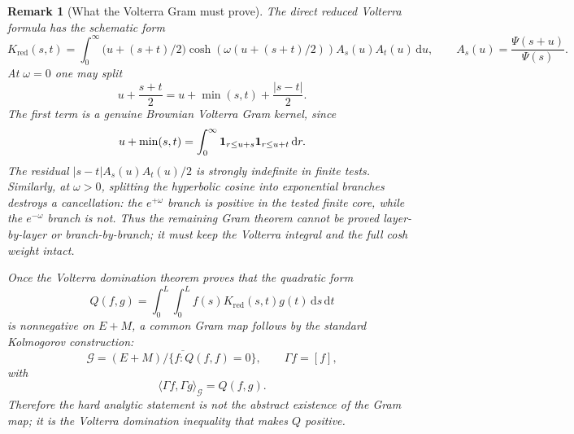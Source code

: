 \documentclass[11pt]{article}
\newtheorem{remark}[theorem]{Remark}
\newcommand{\dd}{\,\mathrm d}
\newcommand{\Kred}{K_{\mathrm{red}}}
\begin{document}
\begin{remark}[What the Volterra Gram must prove]
The direct reduced Volterra formula has the schematic form
\[
  \Kred(s,t)
  =
  \int_0^\infty
  \bigl(u+(s+t)/2\bigr)
  \cosh(\omega(u+(s+t)/2))
  A_s(u)A_t(u)\dd u,
  \qquad
  A_s(u)=\frac{\Psi(s+u)}{\Psi(s)}.
\]
At $\omega=0$ one may split
\[
  u+\frac{s+t}{2}
  =
  u+\min(s,t)+\frac{|s-t|}{2}.
\]
The first term is a genuine Brownian Volterra Gram kernel, since
\[
  u+\min(s,t)
  =
  \int_0^\infty
  {\bf 1}_{r\le u+s}{\bf 1}_{r\le u+t}\dd r.
\]
The residual $|s-t|A_s(u)A_t(u)/2$ is strongly indefinite in finite tests.
Similarly, at $\omega>0$, splitting the hyperbolic cosine into exponential
branches destroys a cancellation: the $e^{+\omega}$ branch is positive in the
tested finite core, while the $e^{-\omega}$ branch is not.  Thus the remaining
Gram theorem cannot be proved layer-by-layer or branch-by-branch; it must keep
the Volterra integral and the full cosh weight intact.

Once the Volterra domination theorem proves that the quadratic form
\[
  Q(f,g)=\int_0^L\int_0^L f(s)\Kred(s,t)g(t)\dd s\dd t
\]
is nonnegative on $E+M$, a common Gram map follows by the standard
Kolmogorov construction:
\[
  \mathcal G=\overline{(E+M)/\{f:Q(f,f)=0\}},
  \qquad
  \Gamma f=[f],
\]
with
\[
  \langle \Gamma f,\Gamma g\rangle_{\mathcal G}=Q(f,g).
\]
Therefore the hard analytic statement is not the abstract existence of the
Gram map; it is the Volterra domination inequality that makes $Q$ positive.
\end{remark}
\end{document}
